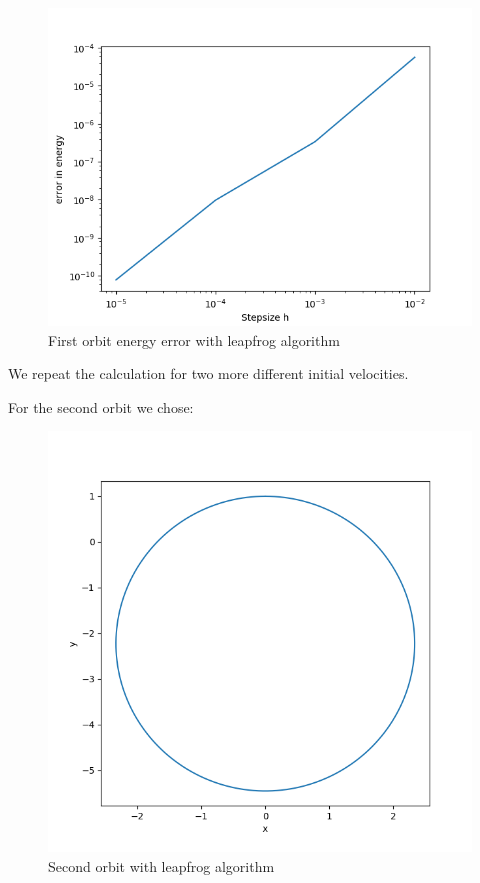 \documentclass[11pt, a4paper, reqno]{scrartcl}
\begin{document}
    		\begin{figure}[H]
    			\includegraphics[width=.5\paperwidth]{figure_leap_1_2.png}
    			\caption{First orbit energy error with leapfrog algorithm}
    		\end{figure}
    		
    		
    		We repeat the calculation for two more different initial velocities.
    		
    		For the second orbit we chose:
    		\begin{figure}[H]
        		   
    		\end{figure}
    		
    		\begin{figure}[H]
    			\includegraphics[width=.5\paperwidth]{figure_leap_2.png}
    			\caption{Second orbit with leapfrog algorithm}
    		\end{figure}
    		
\end{document}
